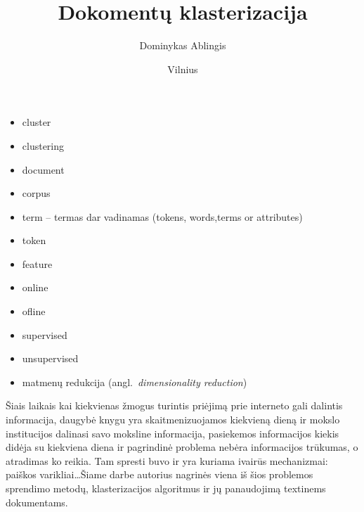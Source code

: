\documentclass{VUMIFInfKursinis}
\title{Dokomentų klasterizacija}
\author{Dominykas Ablingis}
\date{Vilnius \\ \the\year}
\newif\iffast{} %
\begin{document}
\iffast{}
	\newcommand{\rewrite}[1]{\todo[linecolor=red,backgroundcolor=red!25,bordercolor=red]{#1}}
	\newcommand{\needsource}[1]{\todo[linecolor=blue,backgroundcolor=blue!25,bordercolor=blue,]{#1}}
	\newcommand{\toadd}[1]{\todo[linecolor=OliveGreen,backgroundcolor=OliveGreen!25,bordercolor=OliveGreen,]{#1}}
	\newcommand{\note}[1]{\todo[linecolor=Plum,backgroundcolor=Plum!25,bordercolor=Plum]{#1}}
	\newcommand{\thiswillnotshow}[1]{\todo[disable]{#1}}
	\listoftodos[Notes]
\else
	\newcommand{\rewrite}[1]{}
	\newcommand{\needsource}[1]{}
	\newcommand{\toadd}[1]{}
	\newcommand{\note}[1]{}
	\newcommand{\thiswillnotshow}[1]{}
\fi

\maketitle
\tableofcontents


\newcommand{\ltang}[2]{#1 (angl.\  \textit{#2}) }
\newcommand{\BigO}[1]{$\mathcal{O}(#1)$}

\begin{itemize}
	\item cluster
	\item clustering
	\item document
	\item corpus
	\item term – termas dar vadinamas (tokens, words,terms or attributes)
	\item token
	\item feature
	\item online
	\item ofline
	\item supervised
	\item unsupervised
	\item \ltang{matmenų redukcija}{dimensionality reduction}
\end{itemize}

Šiais laikais kai kiekvienas žmogus turintis priėjimą prie interneto gali dalintis informacija, daugybė knygu yra skaitmenizuojamos kiekvieną dieną ir mokslo institucijos dalinasi savo moksline informacija, pasiekemos informacijos kiekis didėja su kiekviena diena ir pagrindinė problema nebėra informacijos trūkumas, o atradimas ko reikia. Tam spresti buvo ir yra kuriama ivairūs mechanizmai: paiškos varikliai\ldots Šiame darbe autorius nagrinės viena iš šios problemos sprendimo metodų, klasterizacijos algoritmus ir jų panaudojimą textinems dokumentams. %
\end{document}
